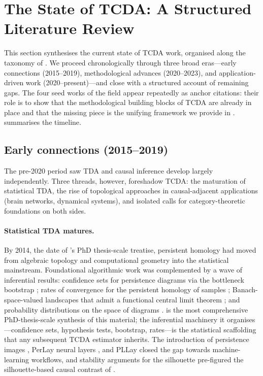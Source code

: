 \section{The State of TCDA: A Structured Literature Review}\label{sec:literature}

This section synthesises the current state of TCDA work, organised along
the taxonomy of . We proceed chronologically through
three broad eras---early connections (2015--2019), methodological
advances (2020--2023), and application-driven work (2020--present)---and
close with a structured account of remaining gaps. The four seed works
of the field appear repeatedly as anchor citations: their role is to
show that the methodological building blocks of TCDA are already in
place and that the missing piece is the unifying framework we provide in
.  summarises the timeline.



\subsection{Early connections (2015--2019)}\label{sec:lit_early}

The pre-2020 period saw TDA and causal inference develop largely
independently. Three threads, however, foreshadow TCDA: the maturation
of statistical TDA, the rise of topological approaches in
causal-adjacent applications (brain networks, dynamical systems), and
isolated calls for category-theoretic foundations on both sides.

\paragraph{Statistical TDA matures.}
By 2014, the date of \citet{lecci2014statistical}'s PhD thesis-scale
treatise, persistent homology had moved from algebraic topology and
computational geometry into the statistical mainstream. Foundational
algorithmic work \citep{edelsbrunner2002topological,zomorodian2005topology,
zomorodian2005computing} was complemented by a wave of inferential
results: confidence sets for persistence diagrams via the bottleneck
bootstrap \citep{fasy2014confidence,chazal2013bootstrap}; rates of
convergence for the persistent homology of samples
\citep{chaudhuri2010rates,chazal2015optimal}; Banach-space-valued
landscapes that admit a functional central limit theorem
\citep{bubenik2015statistical,chazal2014stochastic,lecci2014statistical};
and probability distributions on the space of diagrams \citep{mileyko2011probability,
turner2014frechet}. \citet{lecci2014statistical} is the most
comprehensive PhD-thesis-scale synthesis of this material; the
inferential machinery it organises---confidence sets, hypothesis tests,
bootstrap, rates---is the statistical scaffolding that any subsequent
TCDA estimator inherits. The introduction of persistence images
\citep{adams2017persistence}, PerLay neural layers
\citep{carriere2020perslay}, and PLLay \citep{kim2020pllay} closed the
gap towards machine-learning workflows, and stability arguments for
the silhouette \citep{chazal2014stochastic} pre-figured the
silhouette-based causal contrast of \citet{kim2026topological}.

